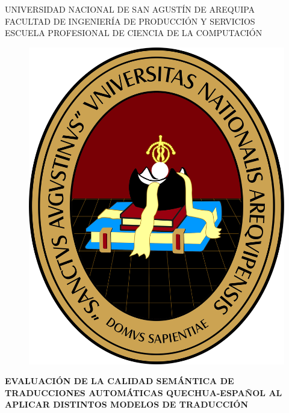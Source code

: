 \documentclass[12pt,a4paper,oneside]{report}
\begin{document}
\begin{titlepage}
\begin{center}
    { \large UNIVERSIDAD NACIONAL DE SAN AGUSTÍN DE AREQUIPA}\\
    \vspace{4mm} 
    {\large FACULTAD DE INGENIERÍA DE PRODUCCIÓN Y SERVICIOS}\\
    \vspace{4mm} 
    {\large ESCUELA PROFESIONAL DE CIENCIA DE LA COMPUTACIÓN}\\
    
    \vspace{1.5cm}
    
    \begin{figure}[H]
        \centering
        \includegraphics[scale=0.3]{imagenes/ESCUDO.jpg}
    \end{figure}
    

    \begin{spacing}{1.5}
    {\large \bf EVALUACIÓN DE LA CALIDAD SEMÁNTICA DE\\ 
    TRADUCCIONES AUTOMÁTICAS QUECHUA-ESPAÑOL AL\\
    APLICAR DISTINTOS MODELOS DE TRADUCCIÓN}\\ %
    \end{spacing}
    

\end{center}
\end{titlepage}
\end{document}
